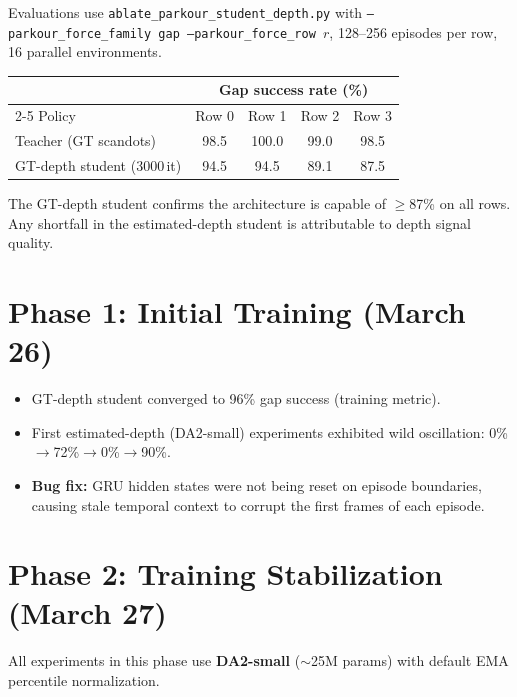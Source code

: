 \documentclass[11pt,a4paper]{article}
\begin{document}
Evaluations use \texttt{ablate\_parkour\_student\_depth.py} with
\texttt{--parkour\_force\_family gap --parkour\_force\_row $r$}, 128--256
episodes per row, 16 parallel environments.

\begin{center}
\begin{tabular}{l cccc}
\toprule
& \multicolumn{4}{c}{Gap success rate (\%)} \\
\cmidrule(lr){2-5}
Policy & Row 0 & Row 1 & Row 2 & Row 3 \\
\midrule
Teacher (GT scandots) & 98.5 & 100.0 & 99.0 & 98.5 \\
GT-depth student (3000\,it) & 94.5 & 94.5 & 89.1 & 87.5 \\
\bottomrule
\end{tabular}
\end{center}

The GT-depth student confirms the architecture is capable of $\geq$87\%
on all rows.  Any shortfall in the estimated-depth student is attributable
to depth signal quality.

\section{Phase 1: Initial Training (March 26)}

\begin{itemize}[nosep]
  \item GT-depth student converged to 96\% gap success (training metric).
  \item First estimated-depth (DA2-small) experiments exhibited wild
        oscillation: 0\%$\to$72\%$\to$0\%$\to$90\%.
  \item \textbf{Bug fix:} GRU hidden states were not being reset on episode
        boundaries, causing stale temporal context to corrupt the first frames
        of each episode.
\end{itemize}

\section{Phase 2: Training Stabilization (March 27)}

All experiments in this phase use \textbf{DA2-small} ($\sim$25M params) with
default EMA percentile normalization.
\end{document}
